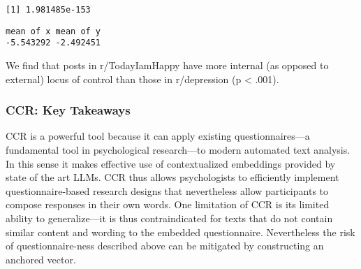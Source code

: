 \documentclass[
  man,
  floatsintext,
  longtable,
  nolmodern,
  notxfonts,
  notimes,
  colorlinks=true,linkcolor=blue,citecolor=blue,urlcolor=blue]{apa7}
\newenvironment{Shaded}{\begin{snugshade}}{\end{snugshade}}
\newcommand{\AttributeTok}[1]{\textcolor[rgb]{0.40,0.45,0.13}{#1}}
\newcommand{\CommentTok}[1]{\textcolor[rgb]{0.37,0.37,0.37}{#1}}
\newcommand{\FunctionTok}[1]{\textcolor[rgb]{0.28,0.35,0.67}{#1}}
\newcommand{\NormalTok}[1]{\textcolor[rgb]{0.00,0.23,0.31}{#1}}
\newcommand{\OtherTok}[1]{\textcolor[rgb]{0.00,0.23,0.31}{#1}}
\newcommand{\SpecialCharTok}[1]{\textcolor[rgb]{0.37,0.37,0.37}{#1}}
\newcommand{\StringTok}[1]{\textcolor[rgb]{0.13,0.47,0.30}{#1}}
\begin{document}
\begin{Shaded}
\end{Shaded}

\begin{verbatim}
[1] 1.981485e-153
\end{verbatim}

\begin{Shaded}
\end{Shaded}

\begin{verbatim}
mean of x mean of y 
-5.543292 -2.492451 
\end{verbatim}

We find that posts in r/TodayIamHappy have more internal (as opposed to
external) locus of control than those in r/depression (p \textless{}
.001).

\subsubsection{CCR: Key Takeaways}\label{ccr-key-takeaways}

CCR is a powerful tool because it can apply existing questionnaires---a
fundamental tool in psychological research---to modern automated text
analysis. In this sense it makes effective use of contextualized
embeddings provided by state of the art LLMs. CCR thus allows
psychologists to efficiently implement questionnaire-based research
designs that nevertheless allow participants to compose responses in
their own words. One limitation of CCR is its limited ability to
generalize---it is thus contraindicated for texts that do not contain
similar content and wording to the embedded questionnaire. Nevertheless
the risk of questionnaire-ness described above can be mitigated by
constructing an anchored vector.
\end{document}
